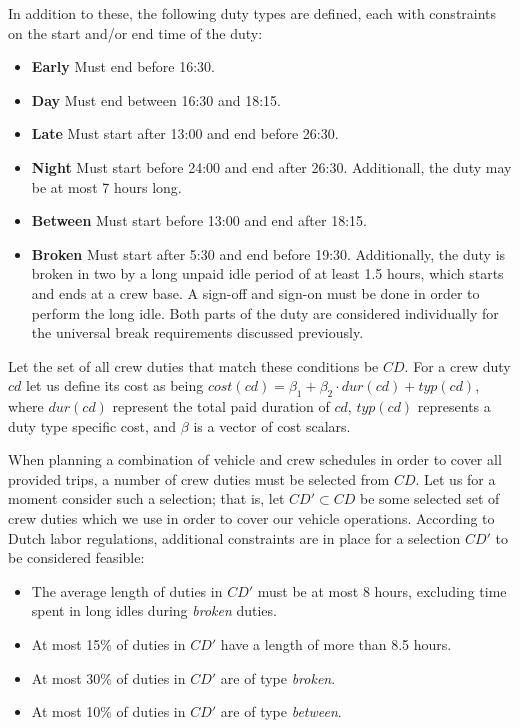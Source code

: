\documentclass[]{article}
\begin{document}
In addition to these, the following duty types are defined, each with constraints on the start and/or end time of the duty:
\begin{itemize}
  \item \textbf{Early} Must end before 16:30.
  \item \textbf{Day} Must end between 16:30 and 18:15.
  \item \textbf{Late} Must start after 13:00 and end before 26:30.
  \item \textbf{Night} Must start before 24:00 and end after 26:30. Additionall, the duty may be at most 7 hours long.
  \item \textbf{Between} Must start before 13:00 and end after 18:15.
  \item \textbf{Broken} Must start after 5:30 and end before 19:30. Additionally, the duty is broken in two by a long unpaid idle period of at least 1.5 hours, which starts and ends at a crew base. A sign-off and sign-on must be done in order to perform the long idle. Both parts of the duty are considered individually for the universal break requirements discussed previously.
\end{itemize}
Let the set of all crew duties that match these conditions be $CD$. For a crew duty $cd$ let us define its cost as being $cost(cd) = \beta_1 + \beta_2 \cdot dur(cd) + typ(cd)$, where $dur(cd)$ represent the total paid duration of $cd$, $typ(cd)$ represents a duty type specific cost, and $\beta$ is a vector of cost scalars. \newline

\noindent When planning a combination of vehicle and crew schedules in order to cover all provided trips, a number of crew duties must be selected from $CD$. Let us for a moment consider such a selection; that is, let $CD' \subset CD$ be some selected set of crew duties which we use in order to cover our vehicle operations. According to Dutch labor regulations, additional constraints are in place for a selection $CD'$ to be considered feasible: 
\begin{itemize}
  \item The average length of duties in $CD'$ must be at most 8 hours, excluding time spent in long idles during \textit{broken} duties.
  \item At most 15\% of duties in $CD'$ have a length of more than 8.5 hours.
  \item At most 30\% of duties in $CD'$ are of type \textit{broken}.
  \item At most 10\% of duties in $CD'$ are of type \textit{between}.
\end{itemize} 
\end{document}

